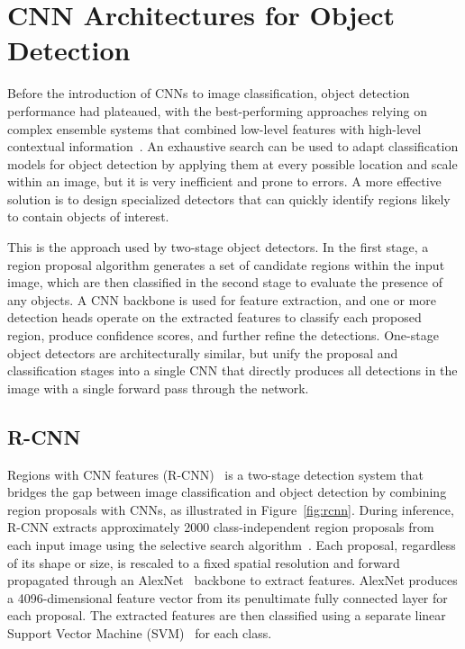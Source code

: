 \chapter{CNN Architectures for Object Detection}
Before the introduction of CNNs to image classification, object detection performance had plateaued, with the best-performing approaches relying on complex ensemble systems that combined low-level features with high-level contextual information~\cite{Girshick2014}. An exhaustive search can be used to adapt classification models for object detection by applying them at every possible location and scale within an image, but it is very inefficient and prone to errors. A more effective solution is to design specialized detectors that can quickly identify regions likely to contain objects of interest.

This is the approach used by two-stage object detectors. In the first stage, a region proposal algorithm generates a set of candidate regions within the input image, which are then classified in the second stage to evaluate the presence of any objects. A CNN backbone is used for feature extraction, and one or more detection heads operate on the extracted features to classify each proposed region, produce confidence scores, and further refine the detections. One-stage object detectors are architecturally similar, but unify the proposal and classification stages into a single CNN that directly produces all detections in the image with a single forward pass through the network.~\cite{Szeliski2022, Liu2020}


\section{R-CNN}
Regions with CNN features (R-CNN)~\cite{Girshick2014} is a two-stage detection system that bridges the gap between image classification and object detection by combining region proposals with CNNs, as illustrated in Figure~\ref{fig:rcnn}. During inference, R-CNN extracts approximately 2000 class-independent region proposals from each input image using the selective search algorithm~\cite{Uijlings2013}. Each proposal, regardless of its shape or size, is rescaled to a fixed spatial resolution and forward propagated through an AlexNet~\cite{Krizhevsky2012} backbone to extract features. AlexNet produces a 4096-dimensional feature vector from its penultimate fully connected layer for each proposal. The extracted features are then classified using a separate linear Support Vector Machine (SVM)~\cite{Cortes1995} for each class.

